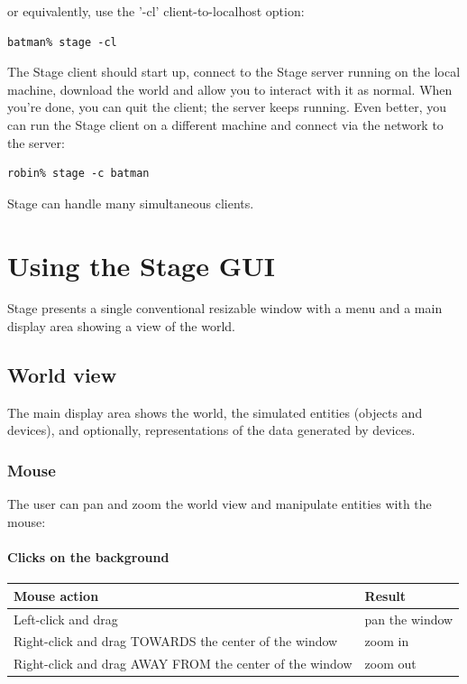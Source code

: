 \documentclass[11pt]{report}
\begin{document}
or equivalently, use the '-cl' client-to-localhost option:

\begin{verbatim}
batman% stage -cl
\end{verbatim}

The Stage client should start up, connect to the Stage server running
on the local machine, download the world and allow you to interact
with it as normal. When you're done, you can quit the client; the
server keeps running. Even better, you can run the Stage client on a
different machine and connect via the network to the server:

\begin{verbatim}
robin% stage -c batman
\end{verbatim}

Stage can handle many simultaneous clients.

\chapter{Using the Stage GUI}

Stage presents a single conventional resizable window with a menu and
a main display area showing a view of the world.

\section{World view}
The main display area shows the world, the simulated entities (objects
and devices), and optionally, representations of the data generated
by devices. 

\subsection{Mouse}
The user can pan and zoom the world view and manipulate entities with
the mouse:

\subsubsection*{Clicks on the background}

\begin{tabular}{|l|l|}
\hline Mouse action & Result\\\hline
Left-click and drag & pan the window\\
Right-click and drag TOWARDS the center of the window & zoom in\\
Right-click and drag AWAY FROM the center of the window & zoom out\\ 
\hline
\end{tabular}
\end{document}
